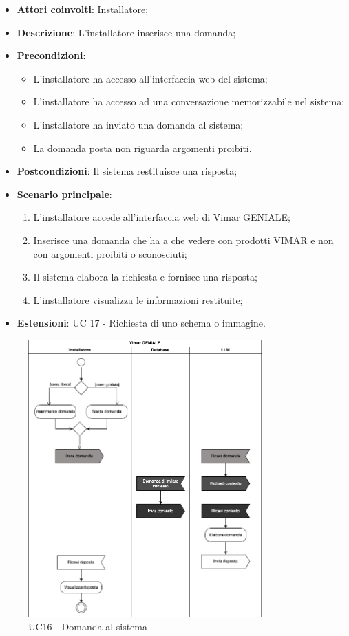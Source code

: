 \begin{itemize}
    \item \textbf{Attori coinvolti}: Installatore;
    \item \textbf{Descrizione}: L’installatore inserisce una domanda;
    \item \textbf{Precondizioni}: 
        \begin{itemize}
            \item L’installatore ha accesso all’interfaccia web del sistema;
            \item L’installatore ha accesso ad una conversazione memorizzabile nel sistema;
            \item L'installatore ha inviato una domanda al sistema;
            \item La domanda posta non riguarda argomenti proibiti.
        \end{itemize}
    \item \textbf{Postcondizioni}: Il sistema restituisce una risposta;
    \item \textbf{Scenario principale}:
    \begin{enumerate}
    \item L’installatore accede all’interfaccia web di Vimar GENIALE;
    \item Inserisce una domanda che ha a che vedere con prodotti VIMAR e non con argomenti proibiti o sconosciuti;
    \item Il sistema elabora la richiesta e fornisce una risposta;
    \item L’installatore visualizza le informazioni restituite;
    \end{enumerate}
    \item \textbf{Estensioni}: UC 17 - Richiesta di uno schema o immagine.
\end{itemize}
\begin{figure}[H]
\centering
\includegraphics[width=0.8\textwidth]{contents/casi_duso/png/UC16_activity.png}
\caption{UC16 - Domanda al sistema}
\end{figure}

